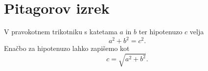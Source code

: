 \documentclass{article}
\begin{document}
\section*{Pitagorov izrek}
V pravokotnem trikotniku s katetama \(a\) in \(b\) ter hipotenuzo \(c\) velja
\[ a^2 + b^2 = c^2. \]
Enačbo za hipotenuzo lahko zapišemo kot
\[ c = \sqrt{a^2 + b^2}. \]
\end{document}
